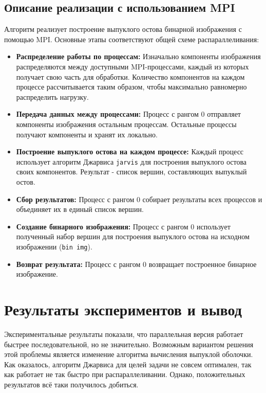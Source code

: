 \documentclass[12pt]{article}
\begin{document}
\subsection*{Описание реализации с использованием MPI}
Алгоритм реализует построение выпуклого остова бинарной изображения с помощью MPI. Основные этапы соответствуют общей схеме распараллеливания:

\begin{itemize}
    \item \textbf{Распределение работы по процессам:}
          Изначально компоненты изображения распределяются между доступными MPI-процессами, каждый из которых получает свою часть для обработки. Количество компонентов на каждом процессе рассчитывается таким образом, чтобы максимально равномерно распределить нагрузку.

    \item \textbf{Передача данных между процессами:}
          Процесс с рангом 0 отправляет компоненты изображения остальным процессам.
Остальные процессы получают компоненты и хранят их локально.

    \item \textbf{Построение выпуклого остова на каждом процессе:}
          Каждый процесс использует алгоритм Джарвиса \texttt{jarvis} для построения выпуклого остова своих компонентов. Результат - список вершин, составляющих выпуклый остов.
    \item \textbf{Сбор результатов:}
Процесс с рангом 0 собирает результаты всех процессов и объединяет их в единый список вершин.

    \item \textbf{Создание бинарного изображения:}
          Процесс с рангом 0 использует полученный набор вершин для построения выпуклого остова на исходном изображении (\texttt{bin img}).
 \item \textbf{Возврат результата:}
Процесс с рангом 0 возвращает построенное бинарное изображение.
\end{itemize}

\section*{Результаты экспериментов и вывод}
Экспериментальные результаты показали, что параллельная версия работает быстрее последовательной, но не значительно. Возможным вариантом решения этой проблемы является изменение алгоритма вычисления выпуклой оболочки. Как оказалось, алгоритм Джарвиса для целей задачи не совсем оптимален, так как работает не так быстро при распараллеливании. Однако, положительных результатов всё таки получилось добиться.
\end{document}

